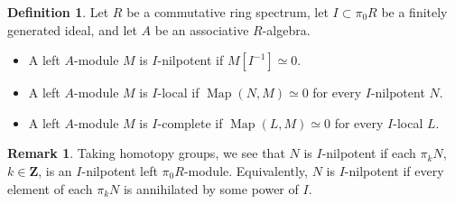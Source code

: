 \documentclass{article}
\renewcommand{\rm}{\mdseries}
\theoremstyle{definition}
\newtheorem{definition}{Definition}[subsection]
\newtheorem{remark}{Remark}[subsection]
\newcommand{\ZZ}{\mathbf{Z}}
\DeclareMathOperator{\Map}{Map}
\begin{document}
\begin{definition}
Let $R$ be a commutative ring spectrum, let $I\subset\pi_0 R$ be a finitely generated ideal, and let $A$ be an associative $R$-algebra.
\begin{itemize}\itemsep.1em
\item[\rm{(1)}]
A left $A$-module $M$ is $I$-nilpotent if $M[I^{-1}]\simeq 0$.
\item[\rm{(2)}]
A left $A$-module $M$ is $I$-local if $\Map(N,M)\simeq 0$ for every $I$-nilpotent $N$.
\item[\rm{(3)}]
A left $A$-module $M$ is $I$-complete if $\Map(L,M)\simeq 0$ for every $I$-local $L$.
\end{itemize}
\end{definition}
\begin{remark}
Taking homotopy groups, we see that $N$ is $I$-nilpotent if each $\pi_k N$, $k\in\ZZ$, is an $I$-nilpotent left $\pi_0 R$-module.
Equivalently, $N$ is $I$-nilpotent if every element of each $\pi_k N$ is annihilated by some power of $I$.
\end{remark}
\end{document}
